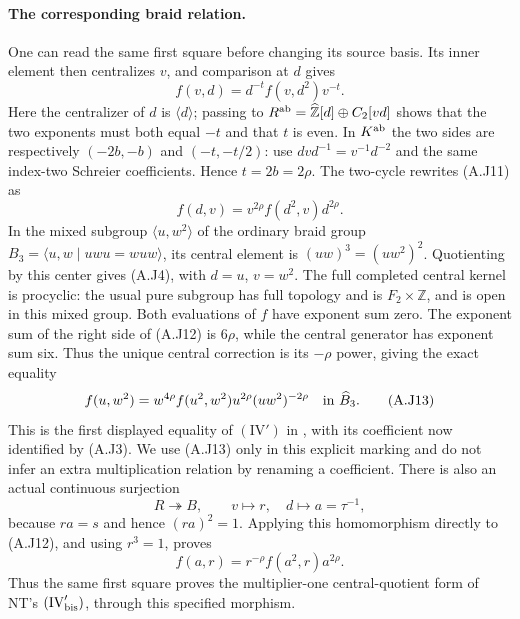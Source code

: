 \paragraph{The corresponding braid relation.}
One can read the same first square before changing its source
basis.  Its inner element then centralizes $v$, and comparison
at $d$ gives
\[
 f(v,d)=d^{-t}f(v,d^2)v^{-t}.                             \tag{A.J11}
\]
Here the centralizer of $d$ is $\langle d\rangle$; passing to
$R^{\rm ab}=\widehat{\mathbb Z}[d]\oplus C_2[vd]$ shows
that the two exponents must both equal $-t$ and that $t$ is
even.  In $K^{\rm ab}$ the two sides are respectively
$(-2b,-b)$ and $(-t,-t/2)$: use
$dvd^{-1}=v^{-1}d^{-2}$ and the same index-two Schreier
coefficients.  Hence $t=2b=2\rho$.  The two-cycle rewrites
(A.J11) as
\[
                f(d,v)=v^{2\rho}f(d^2,v)d^{2\rho}.       \tag{A.J12}
\]
In the mixed subgroup $\langle u,w^2\rangle$ of the ordinary
braid group $B_3=\langle u,w\mid uwu=wuw\rangle$, its central
element is $(uw)^3=(uw^2)^2$.  Quotienting by this center gives
(A.J4), with $d=u$, $v=w^2$.  The full completed central kernel
is procyclic: the usual pure subgroup has full topology and is
$F_2\times\mathbb Z$, and is open in this mixed group.
Both evaluations of $f$ have exponent sum zero.  The exponent
sum of the right side of (A.J12) is $6\rho$, while the central
generator has exponent sum six.  Thus the unique central
correction is its $-\rho$ power, giving the exact equality
\[
 f(u,w^2)=w^{4\rho}f(u^2,w^2)u^{2\rho}(uw^2)^{-2\rho}
                         \quad\hbox{in }\widehat B_3.    \tag{A.J13}
\]
This is the first displayed equality of $(\mathrm{IV}')$ in
\cite[Theorem 2.2]{CA_NS2000}, with its coefficient now
identified by (A.J3).  We use (A.J13) only in this explicit
marking and do not infer an extra multiplication relation by
renaming a coefficient.  There is also an actual continuous
surjection
\[
 R\twoheadrightarrow B,\qquad v\mapsto r,\quad
 d\mapsto a=\tau^{-1},
\]
because $ra=s$ and hence $(ra)^2=1$.  Applying this homomorphism
directly to (A.J12), and using $r^3=1$, proves
\[
          f(a,r)=r^{-\rho}f(a^2,r)a^{2\rho}.             \tag{A.J20}
\]
Thus the same first square proves the multiplier-one
central-quotient form of NT's $(\mathrm{IV}'_{\rm bis})$,
through this specified morphism.

